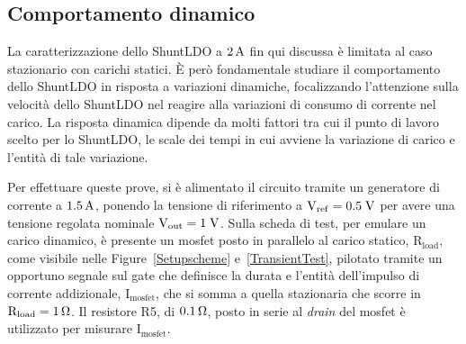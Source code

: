\subsection{Comportamento dinamico}

La caratterizzazione dello ShuntLDO a $2 \rm \, A$ fin qui discussa \`e limitata al caso stazionario con carichi statici.
\`E per\`o fondamentale studiare il comportamento dello ShuntLDO in risposta a variazioni dinamiche, focalizzando l'attenzione sulla velocità dello ShuntLDO nel reagire alla variazioni di consumo di corrente nel carico. 
La risposta dinamica dipende da molti fattori tra cui il punto di lavoro scelto per lo ShuntLDO, le scale dei tempi in cui avviene la variazione di carico e l'entità di tale variazione.

Per effettuare queste prove, si è alimentato il circuito tramite un generatore di corrente a $1.5\rm \, A$, ponendo la tensione di riferimento a $\mathrm{V_{ref}=0.5 \rm \; V}$ per avere una tensione regolata nominale $\mathrm{V_{out}}=1\rm \; V$. %
Sulla scheda di test, per emulare un carico dinamico, è presente un mosfet posto in parallelo al carico statico, $\mathrm{R_{load}}$, come visibile nelle Figure~\ref{Setupscheme} e~\ref{TransientTest}, pilotato tramite un opportuno segnale sul gate che definisce la durata e l'entit\`a dell'impulso di corrente addizionale, $\mathrm{I_{mosfet}}$, che si somma a quella stazionaria che scorre in $\mathrm{R_{load}= 1 {\rm \, \Omega}}$. Il resistore R5, di $0.1 {\rm \, \Omega}$, posto in serie al \textit{drain} del mosfet \`e utilizzato per misurare $\mathrm{I_{mosfet}}$.

